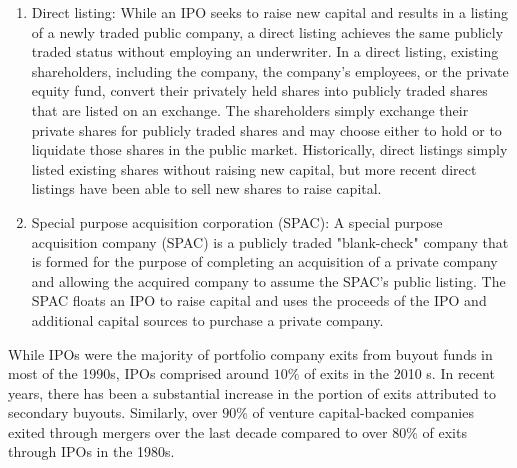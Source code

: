 \documentclass[11pt]{article}
\begin{document}
\begin{enumerate}
  \item Direct listing: While an IPO seeks to raise new capital and results in a listing of a newly traded public company, a direct listing achieves the same publicly traded status without employing an underwriter. In a direct listing, existing shareholders, including the company, the company's employees, or the private equity fund, convert their privately held shares into publicly traded shares that are listed on an exchange. The shareholders simply exchange their private shares for publicly traded shares and may choose either to hold or to liquidate those shares in the public market. Historically, direct listings simply listed existing shares without raising new capital, but more recent direct listings have been able to sell new shares to raise capital.

  \item Special purpose acquisition corporation (SPAC): A special purpose acquisition company (SPAC) is a publicly traded "blank-check" company that is formed for the purpose of completing an acquisition of a private company and allowing the acquired company to assume the SPAC's public listing. The SPAC floats an IPO to raise capital and uses the proceeds of the IPO and additional capital sources to purchase a private company.

\end{enumerate}

While IPOs were the majority of portfolio company exits from buyout funds in most of the 1990s, IPOs comprised around $10 \%$ of exits in the 2010 s. In recent years, there has been a substantial increase in the portion of exits attributed to secondary buyouts. Similarly, over $90 \%$ of venture capital-backed companies exited through mergers over the last decade compared to over $80 \%$ of exits through IPOs in the 1980s.
\end{document}
